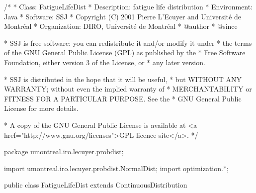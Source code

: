 \begin{code}
\begin{hide}
/*
 * Class:        FatigueLifeDist
 * Description:  fatigue life distribution
 * Environment:  Java
 * Software:     SSJ 
 * Copyright (C) 2001  Pierre L'Ecuyer and Université de Montréal
 * Organization: DIRO, Université de Montréal
 * @author       
 * @since

 * SSJ is free software: you can redistribute it and/or modify it under
 * the terms of the GNU General Public License (GPL) as published by the
 * Free Software Foundation, either version 3 of the License, or
 * any later version.

 * SSJ is distributed in the hope that it will be useful,
 * but WITHOUT ANY WARRANTY; without even the implied warranty of
 * MERCHANTABILITY or FITNESS FOR A PARTICULAR PURPOSE.  See the
 * GNU General Public License for more details.

 * A copy of the GNU General Public License is available at
   <a href="http://www.gnu.org/licenses">GPL licence site</a>.
 */
\end{hide}
package umontreal.iro.lecuyer.probdist;
\begin{hide}
import umontreal.iro.lecuyer.probdist.NormalDist;
import optimization.*;
\end{hide}

public class FatigueLifeDist extends ContinuousDistribution\begin{hide} {
   protected double mu;
   protected double beta;
   protected double gamma;

   private static class Optim implements Uncmin_methods
   {
      private int n;
      private double[] xi;
      private double mu;

      public Optim (double[] x, int n, double min)
      {
         this.n = n;
         this.mu = min;
         this.xi = new double[n];
         System.arraycopy (x, 0, this.xi, 0, n);
      }

      public double f_to_minimize (double[] p)
      {
         double sum = 0.0;

         if ((p[1] <= 0.0) || (p[2] <= 0.0))
            return 1e200;
      
         for (int i = 0; i < n; i++)
            sum -= Math.log (density (mu, p[1], p[2], xi[i]));

         return sum;
      }
      
      public void gradient (double[] x, double[] g)
      {
      }

      public void hessian (double[] x, double[][] h)
      {
      }
   }
\end{hide}
\end{code}

